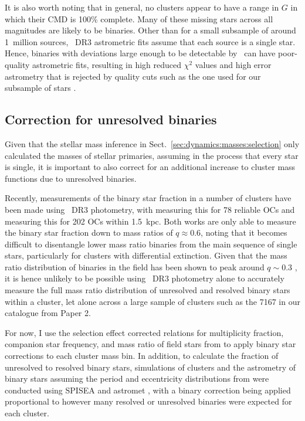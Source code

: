 It is also worth noting that in general, no clusters appear to have a range in $G$ in which their CMD is 100\% complete. Many of these missing stars across all magnitudes are likely to be binaries. Other than for a small subsample of around 1~million sources, \gaia\ DR3 astrometric fits assume that each source is a single star. Hence, binaries with deviations large enough to be detectable by \gaia\ can have poor-quality astrometric fits, resulting in high reduced $\chi^2$ values and high error astrometry that is rejected by quality cuts such as the one used for our subsample of stars \citep[][; see also Sect.~\ref{sec:intro:history:gaia:background}]{lindegren_gaia_2021}.



\subsection{Correction for unresolved binaries}
\label{sec:dynamics:masses:binaries}

Given that the stellar mass inference in Sect.~\ref{sec:dynamics:masses:selection} only calculated the masses of stellar primaries, assuming in the process that every star is single, it is important to also correct for an additional increase to cluster mass functions due to unresolved binaries.

Recently, measurements of the binary star fraction in a number of clusters have been made using \gaia\ DR3 photometry, with \cite{cordoni_photometric_binaries_2023} measuring this for 78 reliable OCs and \cite{donada_multiplicity_fraction_2023} measuring this for 202 OCs within 1.5~kpc. Both works are only able to measure the binary star fraction down to mass ratios of $q\approx0.6$, noting that it becomes difficult to disentangle lower mass ratio binaries from the main sequence of single stars, particularly for clusters with differential extinction. Given that the mass ratio distribution of binaries in the field has been shown to peak around $q\sim0.3$ \citep{moe_mind_2017}, it is hence unlikely to be possible using \gaia\ DR3 photometry alone to accurately measure the full mass ratio distribution of unresolved and resolved binary stars within a cluster, let alone across a large sample of clusters such as the 7167 in our catalogue from Paper 2.

For now, I use the selection effect corrected relations for multiplicity fraction, companion star frequency, and mass ratio of field stars from \cite{moe_mind_2017} to apply binary star corrections to each cluster mass bin. In addition, to calculate the fraction of unresolved to resolved binary stars, simulations of clusters and the astrometry of binary stars assuming the period and eccentricity distributions from \cite{moe_mind_2017} were conducted using SPISEA \citep{hosek_jr_pypopstar_2020} and astromet \citep{penoyre,penoyre_astrometric_2022,penoyre_astrometric_2022-1}, with a binary correction being applied proportional to however many resolved or unresolved binaries were expected for each cluster.

